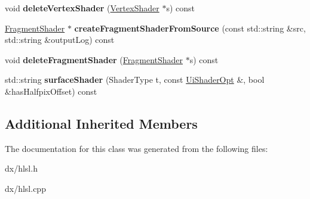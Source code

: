 \begin{DoxyCompactItemize}
\item 
\hypertarget{class_tempest_1_1_h_l_s_l_a728ac5e8a4efd116cfe8d55679f3a0b2}{void {\bfseries delete\+Vertex\+Shader} (\hyperlink{class_tempest_1_1_vertex_shader}{Vertex\+Shader} $\ast$s) const }\label{class_tempest_1_1_h_l_s_l_a728ac5e8a4efd116cfe8d55679f3a0b2}

\item 
\hypertarget{class_tempest_1_1_h_l_s_l_a3ea4e98838da54ed7e79fabe46a3a389}{\hyperlink{class_tempest_1_1_fragment_shader}{Fragment\+Shader} $\ast$ {\bfseries create\+Fragment\+Shader\+From\+Source} (const std\+::string \&src, std\+::string \&output\+Log) const }\label{class_tempest_1_1_h_l_s_l_a3ea4e98838da54ed7e79fabe46a3a389}

\item 
\hypertarget{class_tempest_1_1_h_l_s_l_a66b682bc7c749ab1b016ab79e6d7c901}{void {\bfseries delete\+Fragment\+Shader} (\hyperlink{class_tempest_1_1_fragment_shader}{Fragment\+Shader} $\ast$s) const }\label{class_tempest_1_1_h_l_s_l_a66b682bc7c749ab1b016ab79e6d7c901}

\item 
\hypertarget{class_tempest_1_1_h_l_s_l_a7b8fb84c7e3c992ece821dd1278c39a8}{std\+::string {\bfseries surface\+Shader} (Shader\+Type t, const \hyperlink{struct_tempest_1_1_abstract_shading_lang_1_1_ui_shader_opt}{Ui\+Shader\+Opt} \&, bool \&has\+Halfpix\+Offset) const }\label{class_tempest_1_1_h_l_s_l_a7b8fb84c7e3c992ece821dd1278c39a8}

\end{DoxyCompactItemize}
\subsection*{Additional Inherited Members}


The documentation for this class was generated from the following files\+:\begin{DoxyCompactItemize}
\item 
dx/hlsl.\+h\item 
dx/hlsl.\+cpp\end{DoxyCompactItemize}
